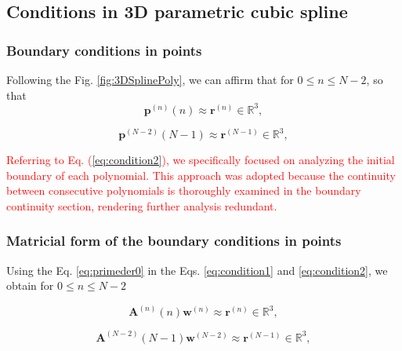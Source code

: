 \subsection{Conditions in 3D parametric cubic spline}\label{sec:boundarycubic}

\subsubsection{Boundary conditions in points}

Following the Fig. \ref{fig:3DSplinePoly}, 
we can affirm that for $0 \leq n\leq N-2$,
so that
\begin{equation}\label{eq:condition1}
\mathbf{p}^{(n)}(n)\approx \mathbf{r}^{(n)}
\in \mathbb{R}^{3},
\end{equation}

\begin{equation}\label{eq:condition2}
\mathbf{p}^{(N-2)}(N-1)\approx \mathbf{r}^{(N-1)}
\in \mathbb{R}^{3},
\end{equation}

\textcolor{red}{Referring to Eq. (\ref{eq:condition2}), 
we specifically focused on analyzing the initial boundary of each polynomial. 
This approach was adopted because the continuity between consecutive polynomials is thoroughly examined in the boundary continuity section, rendering further analysis redundant.}

\subsubsection{Matricial form of the boundary conditions in points}
Using 
the Eq. \ref{eq:primeder0} in 
the Eqs. \ref{eq:condition1} and \ref{eq:condition2},
we obtain for $0 \leq n\leq N-2$

\begin{equation}\label{eq:pointcond1}
\mathbf{A}^{(n)}(n) \mathbf{w}^{(n)}\approx \mathbf{r}^{(n)}
\in \mathbb{R}^{3},
\end{equation}

\begin{equation}\label{eq:pointcond2}
\mathbf{A}^{(N-2)}(N-1) \mathbf{w}^{(N-2)}\approx \mathbf{r}^{(N-1)}
\in \mathbb{R}^{3},
\end{equation}






